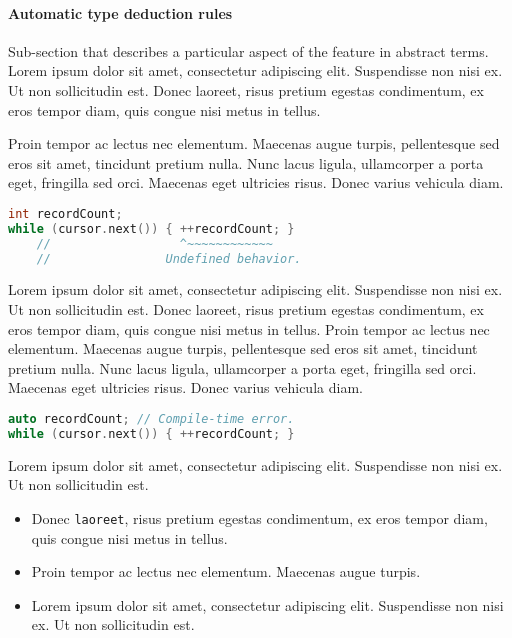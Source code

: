 \documentclass[twoside,10pt,letterpaper,usenames]{newstyle-PearsonGeneric-7-38}
\newcommand{\passthrough}[1]{\texttt{#1}}
\let\Begin\begin
\let\End\end
\begin{document}
\paragraph[Automatic type deduction rules]{Automatic type deduction rules}\label{automatic-type-deduction-rules}

Sub-section that describes a particular aspect of the feature in
abstract terms. Lorem ipsum dolor sit amet, consectetur adipiscing elit.
Suspendisse non nisi ex. Ut non sollicitudin est. Donec laoreet, risus
pretium egestas condimentum, ex eros tempor diam, quis congue nisi metus
in tellus.

\Begin{leftbar}

Proin tempor ac lectus nec elementum. Maecenas augue turpis,
pellentesque sed eros sit amet, tincidunt pretium nulla. Nunc lacus
ligula, ullamcorper a porta eget, fringilla sed orci. Maecenas eget
ultricies risus. Donec varius vehicula diam.

\begin{lstlisting}[language=C++,caption={example caption for recordcount}, label={testlabel}, frame=tb]
int recordCount;
while (cursor.next()) { ++recordCount; }
    //                  ^~~~~~~~~~~~~
    //                Undefined behavior.
\end{lstlisting}
    

\End{leftbar}

Lorem ipsum dolor sit amet, consectetur adipiscing elit. Suspendisse non
nisi ex. Ut non sollicitudin est. Donec laoreet, risus pretium egestas
condimentum, ex eros tempor diam, quis congue nisi metus in tellus.
Proin tempor ac lectus nec elementum. Maecenas augue turpis,
pellentesque sed eros sit amet, tincidunt pretium nulla. Nunc lacus
ligula, ullamcorper a porta eget, fringilla sed orci. Maecenas eget
ultricies risus. Donec varius vehicula diam.

\begin{lstlisting}[language=C++, caption={missing caption}, label={testlabel}, frame=tb]
auto recordCount; // Compile-time error.
while (cursor.next()) { ++recordCount; }
\end{lstlisting}
    

Lorem ipsum dolor sit amet, consectetur adipiscing elit. Suspendisse non
nisi ex. Ut non sollicitudin est.

\begin{itemize}
\item
  Donec \passthrough{\lstinline!laoreet!}, risus pretium egestas
  condimentum, ex eros tempor diam, quis congue nisi metus in tellus.
\item
  Proin tempor ac lectus nec elementum. Maecenas augue turpis.
\item
  Lorem ipsum dolor sit amet, consectetur adipiscing elit. Suspendisse
  non nisi ex. Ut non sollicitudin est.
\end{itemize}
\end{document}
